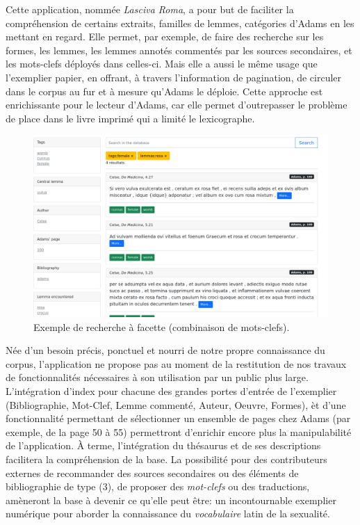 Cette application, nommée \textit{Lasciva Roma}, a pour but de faciliter la compréhension de certains extraits, familles de lemmes, catégories d'Adams en les mettant en regard. Elle permet, par exemple, de faire des recherche sur les formes, les lemmes, les lemmes annotés commentés par les sources secondaires, et les mots-clefs déployés dans celles-ci. Mais elle a aussi le même usage que l'exemplier papier, en offrant, à travers l'information de pagination, de circuler dans le corpus au fur et à mesure qu'Adams le déploie. Cette approche est enrichissante pour le lecteur d'Adams, car elle permet d'outrepasser le problème de place dans le livre imprimé qui a limité le lexicographe.

\begin{figure}
    \centering
    \includegraphics[width=.8\linewidth]{figures/chap1/part3/exemplier/RechercheFacette.png}
    \caption{Exemple de recherche à facette (combinaison de mots-clefs).}
    \label{fig:exemplier:recherche}
\end{figure}

Née d'un besoin précis, ponctuel et nourri de notre propre connaissance du corpus, l'application ne propose pas au moment de la restitution de nos travaux de fonctionnalités nécessaires à son utilisation par un public plus large. L'intégration d'index pour chacune des grandes portes d'entrée de l'exemplier (Bibliographie, Mot-Clef, Lemme commenté, Auteur, Oeuvre, Formes), èt d'une fonctionnalité permettant de sélectionner un ensemble de pages chez Adams (par exemple, de la page 50 à 55) permettront d'enrichir encore plus la manipulabilité de l'application. À terme, l'intégration du thésaurus et de ses descriptions facilitera la compréhension de la base. La possibilité pour des contributeurs externes de recommander des sources secondaires ou des éléments de bibliographie de type (3), de proposer des \textit{mot-clefs} ou des traductions, amèneront la base à devenir ce qu'elle peut être: un incontournable exemplier numérique pour aborder la connaissance du \textit{vocabulaire} latin de la sexualité.

